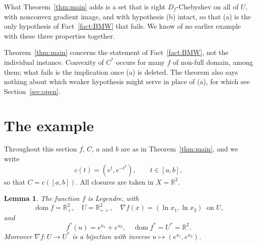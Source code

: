 \documentclass[11pt]{amsart}
\theoremstyle{plain}
\newtheorem{lemma}[theorem]{Lemma}
\theoremstyle{definition}
\theoremstyle{remark}
\newcommand{\R}{\mathbb{R}}
\newcommand{\dom}{\operatorname{dom}}
\newcommand{\D}{D_f}
\newcommand{\Cstar}{C^{*}}
\begin{document}
What Theorem~\ref{thm:main} adds is a set that is right $\D$-Chebyshev on all of
$U$, with nonconvex gradient image, and with hypothesis (b) intact, so that (a)
is the only hypothesis of Fact~\ref{fact:BMW} that fails. We know of no earlier
example with these three properties together.

Theorem~\ref{thm:main} concerns the statement of Fact~\ref{fact:BMW}, not the
individual instance. Convexity of $\Cstar$ occurs for many $f$ of non-full
domain, \cite[Example 7.5]{BWYY2009} among them; what fails is the implication
once (a) is deleted. The theorem also says nothing about which weaker hypothesis
might serve in place of (a), for which see Section~\ref{sec:open}.

\section{The example}\label{sec:ex}

Throughout this section $f$, $C$, $a$ and $b$ are as in
Theorem~\ref{thm:main}, and we write
\[
  c(t) = (e^{t}, e^{-t^{2}}), \qquad t \in [a,b],
\]
so that $C = c([a,b])$. All closures are taken in $X = \R^{2}$.

\begin{lemma}\label{lem:legendre}
The function $f$ is Legendre, with
\[
  \dom f = \R^{2}_{+},
  \quad
  U = \R^{2}_{++},
  \quad
  \nabla f(x) = (\ln x_{1}, \ln x_{2}) \ \text{ on } U,
\]
and
\[
  f^{*}(u) = e^{u_{1}} + e^{u_{2}},
  \quad
  \dom f^{*} = U^{*} = \R^{2}.
\]
Moreover $\nabla f \colon U \to U^{*}$ is a bijection with inverse
$u \mapsto (e^{u_{1}}, e^{u_{2}})$.
\end{lemma}
\end{document}
